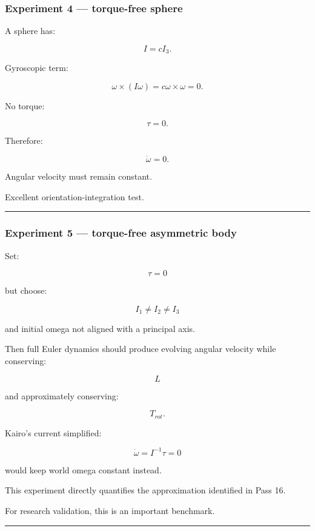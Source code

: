 \subsubsection{Experiment 4 --- torque-free sphere}\label{experiment-4-torque-free-sphere}

A sphere has:

\[
I=cI_3.
\]

Gyroscopic term:

\[
\omega\times(I\omega)
=
c\omega\times\omega
=
0.
\]

No torque:

\[
\tau=0.
\]

Therefore:

\[
\dot\omega=0.
\]

Angular velocity must remain constant.

Excellent orientation-integration test.

\begin{center}\rule{0.5\linewidth}{0.5pt}\end{center}

\subsubsection{Experiment 5 --- torque-free asymmetric body}\label{experiment-5-torque-free-asymmetric-body}

Set:

\[
\tau=0
\]

but choose:

\[
I_1\neq I_2\neq I_3
\]

and initial omega not aligned with a principal axis.

Then full Euler dynamics should produce evolving angular velocity while conserving:

\[
L
\]

and approximately conserving:

\[
T_{rot}.
\]

Kairo's current simplified:

\[
\dot\omega=I^{-1}\tau=0
\]

would keep world omega constant instead.

This experiment directly quantifies the approximation identified in Pass 16.

For research validation, this is an important benchmark.

\begin{center}\rule{0.5\linewidth}{0.5pt}\end{center}

